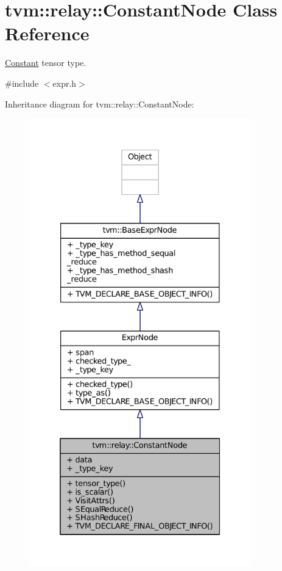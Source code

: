 \hypertarget{classtvm_1_1relay_1_1ConstantNode}{}\section{tvm\+:\+:relay\+:\+:Constant\+Node Class Reference}
\label{classtvm_1_1relay_1_1ConstantNode}


\hyperlink{classtvm_1_1relay_1_1Constant}{Constant} tensor type.  




{\ttfamily \#include $<$expr.\+h$>$}



Inheritance diagram for tvm\+:\+:relay\+:\+:Constant\+Node\+:
\nopagebreak
\begin{figure}[H]
\begin{center}
\leavevmode
\includegraphics[height=550pt]{classtvm_1_1relay_1_1ConstantNode__inherit__graph}
\end{center}
\end{figure}


